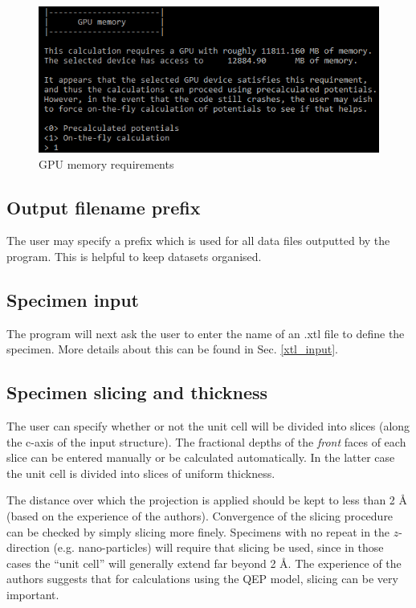\documentclass[12pt,a4paper]{article}
\begin{document}
\begin{figure}[!h]
\begin{center}
\includegraphics[scale=0.75]{GPU_memory.png}
\caption{GPU memory requirements}
\label{fig:GPU_memory}
\end{center}
\end{figure}

\subsection{Output filename prefix}

The user may specify a prefix which is used for all data files outputted by the program.
This is helpful to keep datasets organised.

\subsection{Specimen input}

The program will next ask the user to enter the name of an .xtl file to define the specimen.
More details about this can be found in Sec. \ref{xtl_input}.

\subsection{Specimen slicing and thickness}

The user can specify whether or not the unit cell will be divided into slices (along the c-axis of the input structure).
The fractional depths of the \emph{front} faces of each slice can be entered manually or be calculated automatically.
In the latter case the unit cell is divided into slices of uniform thickness.

The distance over which the projection is applied should be kept to less than 2 {\AA} (based on the experience of the authors).
Convergence of the slicing procedure can be checked by simply slicing more finely.
Specimens with no repeat in the $z$-direction (e.g. nano-particles) will require that slicing be used, since in those cases the ``unit cell'' will generally extend far beyond 2 \AA{}.
The experience of the authors suggests that for calculations using the QEP model, slicing can be very important.
\end{document}
